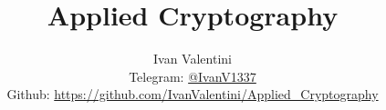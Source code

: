 

\title{\Huge \textbf{Applied Cryptography}}

\author{
	Ivan Valentini \\
	\small Telegram: \href{https://t.me/IvanV1337}{@IvanV1337} \\[3pt]
	\small Github: \href{https://github.com/IvanValentini/Applied_Cryptography}{https://github.com/IvanValentini/Applied\_Cryptography}}

	
	\maketitle
	\tableofcontents
	
	
	
	
	
	
	
	
	
